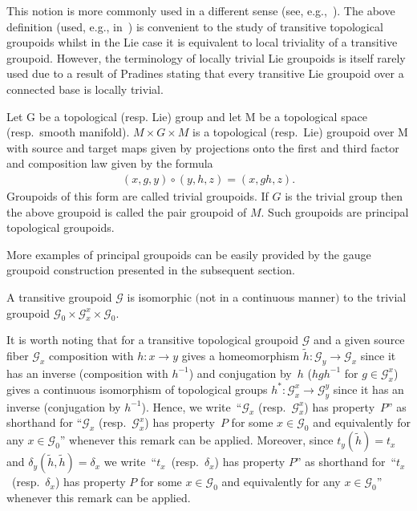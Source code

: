 \begin{rem} This notion is more commonly used in a different sense (see, e.g.,~\cite{R}). The above definition (used, e.g., in~\cite{McK1}) is convenient to the study of transitive topological groupoids whilst in the Lie case it is equivalent to local triviality of a transitive groupoid. However, the terminology of locally trivial Lie groupoids is itself rarely used due to a result of Pradines stating that every transitive Lie groupoid over a connected base is locally trivial.
\end{rem}
\begin{egg}Let G be a topological (resp. Lie) group and let M be a topological space (resp.\ smooth manifold). $M\times G\times M$ is a topological (resp.\ Lie) groupoid over M with source and target maps given by projections onto the first and third factor and composition law given by the formula
\begin{gather*}
(x,g,y)\circ (y,h,z)=(x,gh,z).
\end{gather*}
Groupoids of this form are called trivial groupoids. If $G$ is the trivial group then the above groupoid is called the pair groupoid of $M$. Such groupoids are principal topological groupoids.
\end{egg}
More examples of principal groupoids can be easily provided by the gauge groupoid construction presented in the subsequent section.
\begin{prop} A transitive groupoid $\mathcal{G}$ is isomorphic $($not in a continuous manner$)$ to the trivial groupoid $\mathcal{G}_0\times\mathcal{G}^x_x\times\mathcal{G}_0$.
\end{prop}

\begin{rem} It is worth noting that for a transitive topological groupoid $\mathcal{G}$ and a given source fiber $\mathcal{G}_x$ composition with $h\colon x\rightarrow y$ gives a homeomorphism $\tilde{h}\colon \mathcal{G}_y\rightarrow \mathcal{G}_x$ since it has an inverse (composition with $h^{-1}$) and conjugation by~$h$ ($hgh^{-1}$ for $g\in\mathcal{G}_x^x$) gives a continuous isomorphism of topological groups $h^*\colon \mathcal{G}^x_x\rightarrow \mathcal{G}^y_y$ since it has an inverse (conjugation by $h^{-1}$). Hence, we write~``$\mathcal{G}_x$ (resp.~$\mathcal{G}_x^x$) has property~$P$'' as shorthand for ``$\mathcal{G}_x$ (resp.\ $\mathcal{G}^x_x$) has property~$P$ for some $x\in\mathcal{G}_0$ and equivalently for any $x\in\mathcal{G}_0$'' whenever this remark can be applied. Moreover, since $t_y(\tilde{h})=t_x$ and $\delta_y(\tilde{h},\tilde{h})=\delta_x$ we write~``$t_x$~(resp.~$\delta_x$) has property $P$'' as shorthand for~``$t_x$~(resp.~$\delta_x$) has property $P$ for some $x\in\mathcal{G}_0$ and equivalently for any $x\in\mathcal{G}_0$'' whenever this remark can be applied.
\end{rem}

